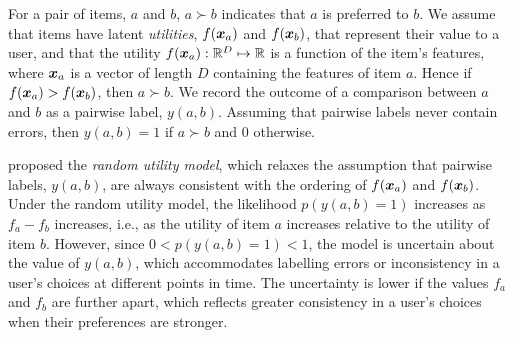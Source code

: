 



For a pair of items, $a$ and $b$, 
$a \succ b$ indicates that $a$ is preferred to $b$.  
We assume that items have latent \emph{utilities},
$f(\boldsymbol x_a)$ and $f(\boldsymbol x_b)$, that represent their value to a user,
and that the 
utility $f(\boldsymbol x_a) : \mathbb{R}^D \mapsto \mathbb{R}$ 
is a function of the item's features, where $\boldsymbol x_a$ is a vector of length $D$
containing the features of item $a$.
Hence if $f(\boldsymbol x_a) > f(\boldsymbol x_b)$, then $a \succ b$.
We record the outcome of a comparison between $a$ and $b$ as 
a pairwise label, $y(a, b)$.
Assuming that pairwise labels never contain errors,
then $y(a, b)=1$ if $a \succ b$ and $0$ otherwise.

\citet{thurstone1927law} proposed the \emph{random utility model},
which relaxes the assumption that pairwise labels, $y(a, b)$,
are always consistent with the ordering of $f(\boldsymbol x_a)$ and $f(\boldsymbol x_b)$.
Under the random utility model, the likelihood $p(y(a,b)=1)$ 
increases as $f_a - f_b$ increases, i.e.,
as the utility of item $a$ increases
relative to the utility of item $b$.
However, since $0 < p(y(a,b)=1) < 1$, the model 
is uncertain about the value of $y(a,b)$,
which accommodates labelling errors or
inconsistency in a user's choices at different points in time.
The uncertainty is lower if the values $f_a$ and $f_b$ are further apart, 
which reflects greater consistency in a user's choices
when their preferences are stronger.
 
